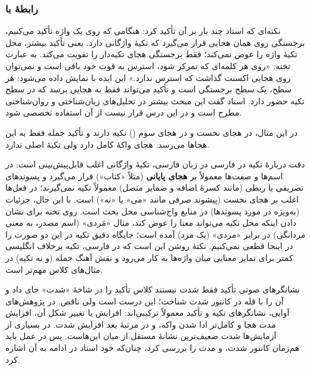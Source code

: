 \subsubsection{رابطهٔ  با }
نکته‌ای که استاد چند بار بر آن تأکید کرد: هنگامی که روی یک واژه تأکید می‌کنیم، برجستگی روی همان هجایی قرار می‌گیرد که تکیهٔ واژگانی دارد. یعنی تأکید بیشتر، محل تکیهٔ واژه را عوض نمی‌کند؛ فقط برجستگی هجای تکیه‌دار را تقویت می‌کند. به عبارت تخته: «روی هر کلمه‌ای که تمرکز شود، استرس به قوت خود باقی است و نمی‌توان روی هجایی اکسنت گذاشت که استرس ندارد.» این ایده با  نمایش داده می‌شود: هر سطح، یک سطح برجستگی است و تأکید می‌تواند فقط به هجایی برسد که در سطح تکیه حضور دارد. استاد گفت این مبحث بیشتر در تحلیل‌های زبان‌شناختی و روان‌شناختی مطرح است و در این درس قرار نیست از آن استفاده تخصصی شود.


در این مثال، در  هجای نخست و در  هجای سوم () تکیه دارند و تأکید جمله فقط به این هجاها می‌رسد. هجای  واکهٔ کامل دارد ولی تکیهٔ اصلی ندارد.

\begin{correctionbox}{دقت دربارهٔ تکیه در فارسی}
در زبان فارسی، تکیهٔ واژگانی اغلب قابل‌پیش‌بینی است: در اسم‌ها و صفت‌ها معمولاً بر \textbf{هجای پایانی} (مثلاً «کتاب») قرار می‌گیرد و پسوندهای تصریفی یا ربطی (مانند کسرهٔ اضافه و ضمایر متصل) معمولاً تکیه نمی‌گیرند؛ در فعل‌ها اغلب بر هجای نخست (پیشوند صرفی مانند «می‌» یا «نه‌») است. با این حال، جزئیات (به‌ویژه در مورد پسوندها) در منابع واج‌شناسی محل بحث است. روی تخته برای نشان دادن اینکه محل تکیه می‌تواند معنا را عوض کند، مثال «مَردی» (اسم مصدر، به معنی مردانگی) در برابر «مردی» (یک مرد) آمده است؛ جایگاه دقیق تکیه در این دو صورت را در اینجا قطعی نمی‌کنیم. نکتهٔ روشن این است که در فارسی، تکیه برخلاف انگلیسی کمتر برای تمایز معنایی میان واژه‌ها به کار می‌رود و نقش آهنگ جمله (و نه تکیه) در مثال‌های کلاس مهم‌تر است.
\end{correctionbox}

\begin{correctionbox}{نشانگرهای صوتی تأکید فقط شدت نیستند}
کلاس تأکید را در شاخهٔ «شدت» جای داد و آن را با قله در کانتور شدت شناخت؛ این درست است ولی ناقص. در پژوهش‌های آوایی، نشانگرهای تکیه و تأکید معمولاً ترکیبی‌اند: افزایش  یا تغییر شکل آن، افزایش مدت هجا و کامل‌تر ادا شدن واکه، و در مرتبهٔ بعد افزایش شدت. در بسیاری از آزمایش‌ها شدت ضعیف‌ترین نشانهٔ مستقل از میان این‌هاست. پس در عمل باید هم‌زمان کانتور شدت،  و مدت را بررسی کرد، چنان‌که خود استاد در ادامه به آن اشاره کرد.
\end{correctionbox}

